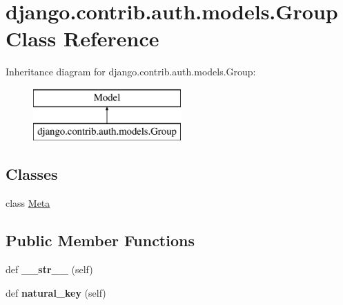 \hypertarget{classdjango_1_1contrib_1_1auth_1_1models_1_1_group}{}\section{django.\+contrib.\+auth.\+models.\+Group Class Reference}
\label{classdjango_1_1contrib_1_1auth_1_1models_1_1_group}
Inheritance diagram for django.\+contrib.\+auth.\+models.\+Group\+:\begin{figure}[H]
\begin{center}
\leavevmode
\includegraphics[height=2.000000cm]{classdjango_1_1contrib_1_1auth_1_1models_1_1_group}
\end{center}
\end{figure}
\subsection*{Classes}
\begin{DoxyCompactItemize}
\item 
class \mbox{\hyperlink{classdjango_1_1contrib_1_1auth_1_1models_1_1_group_1_1_meta}{Meta}}
\end{DoxyCompactItemize}
\subsection*{Public Member Functions}
\begin{DoxyCompactItemize}
\item 
\mbox{\label{classdjango_1_1contrib_1_1auth_1_1models_1_1_group_afbbb0ef7e3dd642020c58d9d9077d7a5}} 
def {\bfseries \+\_\+\+\_\+str\+\_\+\+\_\+} (self)
\item 
\mbox{\label{classdjango_1_1contrib_1_1auth_1_1models_1_1_group_a127ac918c8d259b1914ec353d6b53204}} 
def {\bfseries natural\+\_\+key} (self)
\end{DoxyCompactItemize}
